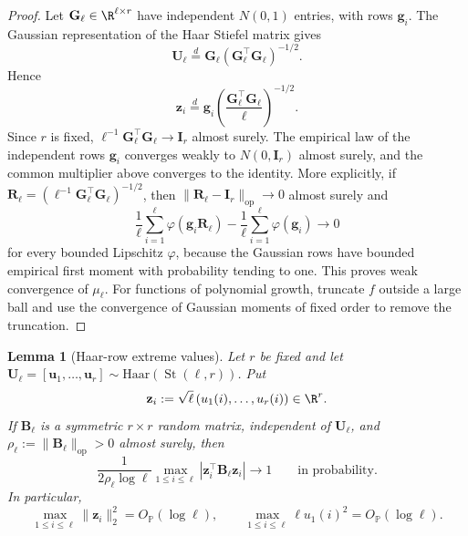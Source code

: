 \documentclass{article}
\newcommand{\Prob}{\mathbb{P}}
\newcommand{\St}{\operatorname{St}}
\newcommand{\op}{\operatorname{op}}
\newcommand{\bB}{\mathbf{B}}
\newcommand{\bU}{\mathbf{U}}
\newcommand{\bu}{\mathbf{u}}
\newcommand{\bG}{\mathbf{G}}
\newtheorem{lemma}[theorem]{Lemma}
\theoremstyle{definition}
\theoremstyle{remark}
\begin{document}
\begin{proof}
Let $\bG_\ell\in\R^{\ell\times r}$ have independent $N(0,1)$ entries, with rows
$\mathbf g_i$.  The Gaussian representation of the Haar Stiefel matrix gives
\[
    \bU_\ell
    \stackrel{d}{=}
    \bG_\ell(\bG_\ell^\top\bG_\ell)^{-1/2}.
\]
Hence
\[
    \mathbf z_i
    \stackrel{d}{=}
    \mathbf g_i
    \left(\frac{\bG_\ell^\top\bG_\ell}{\ell}\right)^{-1/2}.
\]
Since $r$ is fixed,
$\ell^{-1}\bG_\ell^\top\bG_\ell\to\mathbf I_r$ almost surely.  The empirical
law of the independent rows $\mathbf g_i$ converges weakly to
$N(0,\mathbf I_r)$ almost surely, and the common multiplier above converges to
the identity.  More explicitly, if
$\mathbf R_\ell=(\ell^{-1}\bG_\ell^\top\bG_\ell)^{-1/2}$, then
$\|\mathbf R_\ell-\mathbf I_r\|_{\op}\to0$ almost surely and
\[
    \frac1\ell\sum_{i=1}^{\ell}
    \varphi(\mathbf g_i\mathbf R_\ell)
    -
    \frac1\ell\sum_{i=1}^{\ell}
    \varphi(\mathbf g_i)
    \longrightarrow0
\]
for every bounded Lipschitz $\varphi$, because the Gaussian rows have bounded
empirical first moment with probability tending to one.  This proves weak
convergence of $\mu_\ell$.  For functions of polynomial growth, truncate $f$
outside a large ball and use the convergence of Gaussian moments of fixed order
to remove the truncation.
\end{proof}

\begin{lemma}[Haar-row extreme values]
Let $r$ be fixed and let
$\bU_\ell=[\bu_1,\ldots,\bu_r]\sim\mathrm{Haar}(\St(\ell,r))$.  Put
\[
    \mathbf z_i
    :=
    \sqrt\ell\,(u_1(i),\ldots,u_r(i))\in\R^r.
\]
If $\bB_\ell$ is a symmetric $r\times r$ random matrix, independent of
$\bU_\ell$, and
$\rho_\ell:=\|\bB_\ell\|_{\op}>0$ almost surely, then
\begin{equation}
    \frac{1}{2\rho_\ell\log\ell}
    \max_{1\leq i\leq\ell}
    |\mathbf z_i^\top\bB_\ell\mathbf z_i|
    \longrightarrow 1
    \qquad\text{in probability.}
    \label{eq:haar-quadratic-maximum}
\end{equation}
In particular,
\begin{equation}
    \max_{1\leq i\leq\ell}\|\mathbf z_i\|_2^2=O_{\Prob}(\log\ell),
    \qquad
    \max_{1\leq i\leq\ell}\ell u_1(i)^2=O_{\Prob}(\log\ell).
    \label{eq:haar-coordinate-maximum}
\end{equation}
\label{lem:haar-row-extremes}
\end{lemma}
\end{document}
